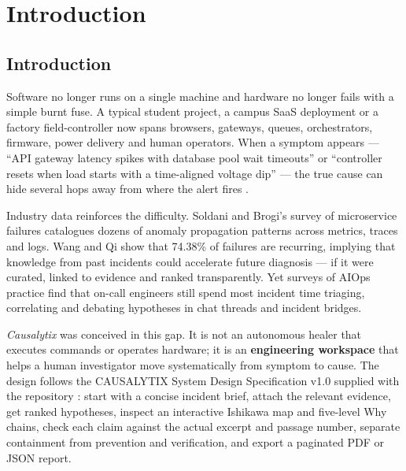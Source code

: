 \documentclass[12pt,a4paper,oneside]{report}
\begin{document}
\cleardoublepage
{}
\setcounter{page}{1}

\chapter{Introduction}
\label{ch:intro}

\section{Introduction}
\label{sec:intro}

Software no longer runs on a single machine and hardware no longer fails with a simple burnt fuse. A typical student project, a campus SaaS deployment or a factory field-controller now spans browsers, gateways, queues, orchestrators, firmware, power delivery and human operators. When a symptom appears --- ``API gateway latency spikes with database pool wait timeouts'' or ``controller resets when load starts with a time-aligned voltage dip'' --- the true cause can hide several hops away from where the alert fires \cite{soldani2022anomaly,wang2024comprehensive}.

Industry data reinforces the difficulty. Soldani and Brogi's survey of microservice failures \cite{soldani2022anomaly} catalogues dozens of anomaly propagation patterns across metrics, traces and logs. Wang and Qi \cite{wang2024comprehensive} show that 74.38\% of failures are recurring, implying that knowledge from past incidents could accelerate future diagnosis --- if it were curated, linked to evidence and ranked transparently. Yet surveys of AIOps practice \cite{notaro2021ahead,remil2024aiops} find that on-call engineers still spend most incident time triaging, correlating and debating hypotheses in chat threads and incident bridges.

\textit{Causalytix} was conceived in this gap. It is not an autonomous healer that executes commands or operates hardware; it is an \textbf{engineering workspace} that helps a human investigator move systematically from symptom to cause. The design follows the CAUSALYTIX System Design Specification v1.0 supplied with the repository \cite{lascasas2024llexus,chen2024rcacopilot}: start with a concise incident brief, attach the relevant evidence, get ranked hypotheses, inspect an interactive Ishikawa map and five-level Why chains, check each claim against the actual excerpt and passage number, separate containment from prevention and verification, and export a paginated PDF or JSON report.
\end{document}
